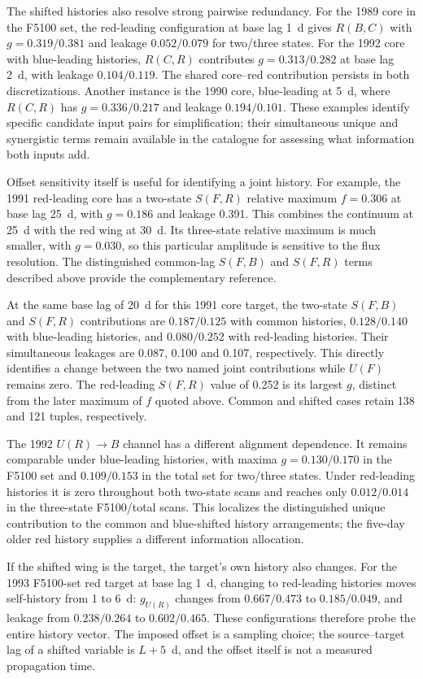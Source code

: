 \documentclass[fleqn,usenatbib]{mnras}
\begin{document}
The shifted histories also resolve strong pairwise redundancy. For the 1989 core in the F5100 set, the red-leading configuration at base lag 1~d gives $R(B,C)$ with $g=0.319/0.381$ and leakage $0.052/0.079$ for two/three states. For the 1992 core with blue-leading histories, $R(C,R)$ contributes $g=0.313/0.282$ at base lag 2~d, with leakage $0.104/0.119$. The shared core--red contribution persists in both discretizations. Another instance is the 1990 core, blue-leading at 5~d, where $R(C,R)$ has $g=0.336/0.217$ and leakage $0.194/0.101$. These examples identify specific candidate input pairs for simplification; their simultaneous unique and synergistic terms remain available in the catalogue for assessing what information both inputs add.

Offset sensitivity itself is useful for identifying a joint history. For example, the 1991 red-leading core has a two-state $S(F,R)$ relative maximum $f=0.306$ at base lag 25~d, with $g=0.186$ and leakage 0.391. This combines the continuum at 25~d with the red wing at 30~d. Its three-state relative maximum is much smaller, with $g=0.030$, so this particular amplitude is sensitive to the flux resolution. The distinguished common-lag $S(F,B)$ and $S(F,R)$ terms described above provide the complementary reference.

At the same base lag of 20~d for this 1991 core target, the two-state $S(F,B)$ and $S(F,R)$ contributions are $0.187/0.125$ with common histories, $0.128/0.140$ with blue-leading histories, and $0.080/0.252$ with red-leading histories. Their simultaneous leakages are 0.087, 0.100 and 0.107, respectively. This directly identifies a change between the two named joint contributions while $U(F)$ remains zero. The red-leading $S(F,R)$ value of 0.252 is its largest $g$, distinct from the later maximum of $f$ quoted above. Common and shifted cases retain 138 and 121 tuples, respectively.

The 1992 $U(R)\to B$ channel has a different alignment dependence. It remains comparable under blue-leading histories, with maxima $g=0.130/0.170$ in the F5100 set and $0.109/0.153$ in the total set for two/three states. Under red-leading histories it is zero throughout both two-state scans and reaches only $0.012/0.014$ in the three-state F5100/total scans. This localizes the distinguished unique contribution to the common and blue-shifted history arrangements; the five-day older red history supplies a different information allocation.

If the shifted wing is the target, the target's own history also changes. For the 1993 F5100-set red target at base lag 1~d, changing to red-leading histories moves self-history from 1 to 6~d: $g_{U(R)}$ changes from $0.667/0.473$ to $0.185/0.049$, and leakage from $0.238/0.264$ to $0.602/0.465$. These configurations therefore probe the entire history vector. The imposed offset is a sampling choice; the source--target lag of a shifted variable is $L+5$~d, and the offset itself is not a measured propagation time.
\end{document}
